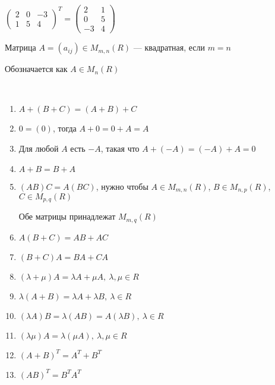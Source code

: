 \begin{example}
    $\begin{pmatrix}
        2 & 0 & -3 \\
        1 & 5 & 4
    \end{pmatrix}^T = \begin{pmatrix}
        2 & 1 \\
        0 & 5 \\
        -3 & 4
    \end{pmatrix}$
\end{example}

\begin{defn}
    Матрица $A = (a_{ij}) \in M_{m, n}(R)$ --- квадратная, если $m = n$

    Обозначается как $A \in M_{n}(R)$
\end{defn}

\begin{theorem}~

    \begin{enumerate}
        \item $A + (B + C) = (A + B) + C$
        
        \item $0 = (0)$, тогда $A + 0 = 0 + A = A$
        
        \item Для любой $A$ есть $-A$, такая что $A + (-A) = (-A) + A = 0$
        
        \item $A + B = B + A$
        
        \item $(AB)C = A(BC)$, нужно чтобы $A \in M_{m, n}(R)$, $B \in M_{n, p}(R)$, $C \in M_{p, q}(R)$
        
        Обе матрицы принадлежат $M_{m, q}(R)$

        \item $A(B + C) = AB + AC$
        
        \item $(B + C)A = BA + CA$
    
        \item $(\lambda + \mu) A = \lambda A + \mu A,~\lambda, \mu \in R$
        
        \item $\lambda(A + B) = \lambda A + \lambda B,~\lambda \in R$
        
        \item $(\lambda A) B = \lambda (A B) = A(\lambda B),~\lambda \in R$
        
        \item $(\lambda \mu) A = \lambda (\mu A),~\lambda, \mu \in R$
        
        \item $(A + B)^T = A^T + B^T$
        
        \item $(AB)^T = B^T A^T$
    \end{enumerate}
\end{theorem}

